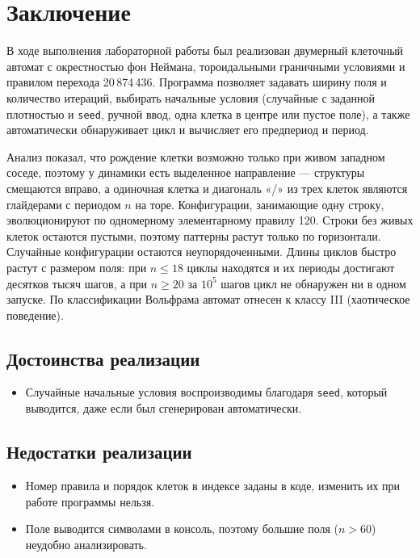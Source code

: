 \newpage
\section*{Заключение}
{}

В ходе выполнения лабораторной работы был реализован двумерный клеточный автомат с окрестностью фон Неймана, тороидальными граничными условиями и правилом перехода 20\,874\,436. Программа позволяет задавать ширину поля и количество итераций, выбирать начальные условия (случайные с заданной плотностью и \texttt{seed}, ручной ввод, одна клетка в центре или пустое поле), а также автоматически обнаруживает цикл и вычисляет его предпериод и период.

Анализ показал, что рождение клетки возможно только при живом западном соседе, поэтому у динамики есть выделенное направление --- структуры смещаются вправо, а одиночная клетка и диагональ «/» из трех клеток являются глайдерами с периодом $n$ на торе. Конфигурации, занимающие одну строку, эволюционируют по одномерному элементарному правилу 120. Строки без живых клеток остаются пустыми, поэтому паттерны растут только по горизонтали. Случайные конфигурации остаются неупорядоченными. Длины циклов быстро растут с размером поля: при $n \le 18$ циклы находятся и их периоды достигают десятков тысяч шагов, а при $n \ge 20$ за $10^5$ шагов цикл не обнаружен ни в одном запуске. По классификации Вольфрама автомат отнесен к классу III (хаотическое поведение).

\subsection*{Достоинства реализации}

\begin{itemize}
	\item Случайные начальные условия воспроизводимы благодаря \texttt{seed}, который выводится, даже если был сгенерирован автоматически.
\end{itemize}

\subsection*{Недостатки реализации}

\begin{itemize}
	\item Номер правила и порядок клеток в индексе заданы в коде, изменить их при работе программы нельзя.
	\item Поле выводится символами в консоль, поэтому большие поля ($n > 60$) неудобно анализировать.
\end{itemize}


